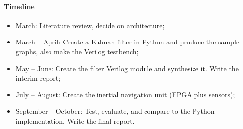 \documentclass[12pt]{article}
\begin{document}
\paragraph{Timeline}
\begin{itemize}[noitemsep]
\item March: Literature review, decide on architecture;
\item March -- April: Create a Kalman filter in Python and produce the sample graphs, also make the Verilog testbench;
\item May -- June: Create the filter Verilog module and synthesize it. Write the interim report;
\item July -- August: Create the inertial navigation unit (FPGA plus sensors);
\item September -- October: Test, evaluate, and compare to the Python implementation. Write the final report.
\end{itemize}
\end{document}
